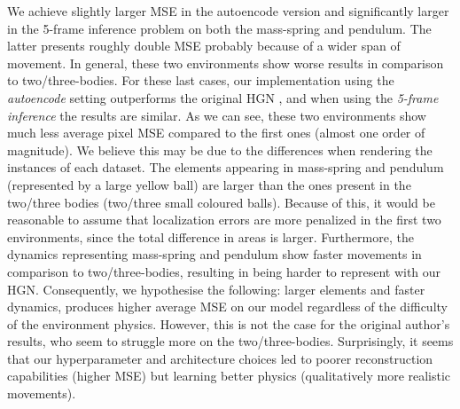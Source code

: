 We achieve slightly larger MSE in the autoencode version and significantly larger in the 5-frame inference problem on both the mass-spring and pendulum.
The latter presents roughly double MSE probably because of a wider span of movement.
In general, these two environments show worse results in comparison to two/three-bodies.
For these last cases, our implementation using the \textit{autoencode} setting outperforms the original HGN \cite{hgn}, and when using the \textit{5-frame inference} the results are similar.
As we can see, these two environments show much less average pixel MSE compared to the first ones (almost one order of magnitude).
We believe this may be due to the differences when rendering the instances of each dataset.
The elements appearing in mass-spring and pendulum (represented by a large yellow ball) are larger than the ones present in the two/three bodies (two/three small coloured balls).
Because of this, it would be reasonable to assume that localization errors are more penalized in the first two environments, since the total difference in areas is larger.
Furthermore, the dynamics representing mass-spring and pendulum show faster movements in comparison to two/three-bodies, resulting in being harder to represent with our HGN.
Consequently, we hypothesise the following: larger elements and faster dynamics, produces higher average MSE on our model regardless of the difficulty of the environment physics.
However, this is not the case for the original author's results, who seem to struggle more on the two/three-bodies.
Surprisingly, it seems that our hyperparameter and architecture choices led to poorer reconstruction capabilities (higher MSE) but learning better physics (qualitatively more realistic movements).








    
     

